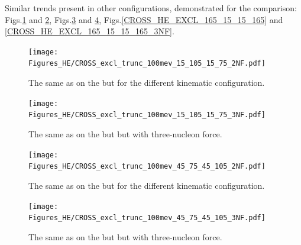     Similar trends present in other configurations, demonstrated for the comparison:
    Figs.\ref{CROSS_HE_EXCL_15_105_15_75} and \ref{CROSS_HE_EXCL_15_105_15_75_3NF},
    Figs.\ref{CROSS_HE_EXCL_45_75_45_105} and \ref{CROSS_HE_EXCL_45_75_45_105_3NF},
    Figs.\ref{CROSS_HE_EXCL_165_15_15_165} and \ref{CROSS_HE_EXCL_165_15_15_165_3NF}.

    
        \begin{figure}[h]
            \begin{center}
                \texttt{[image: Figures\_HE/CROSS\_excl\_trunc\_100mev\_15\_105\_15\_75\_2NF.pdf]}
                \end{center}
                \caption{The same as on the  but for the different kinematic
                configuration.}
                \label{CROSS_HE_EXCL_15_105_15_75}
        \end{figure}

        \begin{figure}[h]
            \begin{center}
                \texttt{[image: Figures\_HE/CROSS\_excl\_trunc\_100mev\_15\_105\_15\_75\_3NF.pdf]}
                \end{center}
                \caption{The same as on the  but but with three-nucleon force.}
                \label{CROSS_HE_EXCL_15_105_15_75_3NF}
        \end{figure}




        \begin{figure}[h]
            \begin{center}
                \texttt{[image: Figures\_HE/CROSS\_excl\_trunc\_100mev\_45\_75\_45\_105\_2NF.pdf]}
                \end{center}
                \caption{The same as on the  but for the different kinematic
                configuration.}
                \label{CROSS_HE_EXCL_45_75_45_105}
        \end{figure}


        \begin{figure}[h]
            \begin{center}
                \texttt{[image: Figures\_HE/CROSS\_excl\_trunc\_100mev\_45\_75\_45\_105\_3NF.pdf]}
                \end{center}
                \caption{The same as on the  but but with three-nucleon force.}
                \label{CROSS_HE_EXCL_45_75_45_105_3NF}
        \end{figure}

